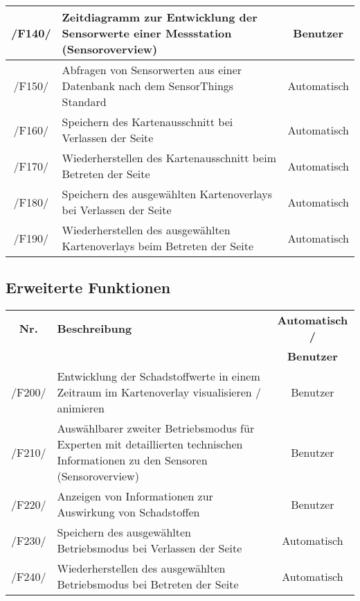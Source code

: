\begin{tabularx}{\textwidth}{| c | X | c |}
        \hline
        /F140/ & Zeitdiagramm zur Entwicklung der Sensorwerte einer Messstation (Sensoroverview) & Benutzer \\
        \hline
        /F150/ & Abfragen von Sensorwerten aus einer Datenbank nach dem SensorThings Standard & Automatisch \\
        \hline
        /F160/ & Speichern des Kartenausschnitt bei Verlassen der Seite & Automatisch \\
        \hline
        /F170/ & Wiederherstellen des Kartenausschnitt beim Betreten der Seite & Automatisch \\
        \hline
        /F180/ & Speichern des ausgewählten Kartenoverlays bei Verlassen der Seite & Automatisch \\
        \hline
        /F190/ & Wiederherstellen des ausgewählten Kartenoverlays beim Betreten der Seite & Automatisch \\
        \hline
\end{tabularx}
\subsection{Erweiterte Funktionen}
\begin{tabularx}{\textwidth}{| c | X | c |}
\hline
        \textbf{Nr.} & 
        \textbf{Beschreibung} & 
        \textbf{Automatisch /} \\
        & & \textbf{Benutzer} \\
        \hline
        /F200/ & Entwicklung der Schadstoffwerte in einem Zeitraum im Kartenoverlay visualisieren / animieren & Benutzer \\
        \hline
        /F210/ & Auswählbarer zweiter Betriebsmodus für Experten mit detaillierten technischen Informationen zu den Sensoren (Sensoroverview) & Benutzer \\
        \hline
        /F220/ & Anzeigen von Informationen zur Auswirkung von Schadstoffen & Benutzer \\
        \hline
        /F230/ & Speichern des ausgewählten Betriebsmodus bei Verlassen der Seite & Automatisch \\
        \hline
        /F240/ & Wiederherstellen des ausgewählten Betriebsmodus bei Betreten der Seite & Automatisch \\
        \hline
\end{tabularx}